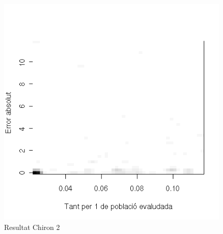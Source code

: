 	\begin{figure}[tbp]
		\begin{center}
			\includegraphics[scale=0.75]{chiron/GraficaChironGuai.png}
		\end{center}
		\caption{Resultat Chiron 2}
		\label{fig:resChir2}
	\end{figure}

